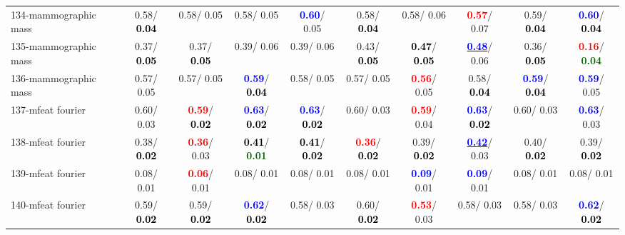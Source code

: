 \begin{table}[h]
\begin{center}
{\begin{tabular}{lc|c|c|c|c|c|c|c|c}
134-mammographic mass &   0.58/\textcolor{black}{\textbf{  0.04}} &   0.58/  0.05 &   0.58/  0.05 & \textcolor{blue}{\textbf{  0.60}}/  0.05 &   0.58/\textcolor{black}{\textbf{  0.04}} &   0.58/  0.06 & \textcolor{red}{\textbf{  0.57}}/  0.07 &   0.59/\textcolor{black}{\textbf{  0.04}} & \textcolor{blue}{\textbf{  0.60}}/\textcolor{black}{\textbf{  0.04}} \\
135-mammographic mass &   0.37/\textcolor{black}{\textbf{  0.05}} &   0.37/\textcolor{black}{\textbf{  0.05}} &   0.39/  0.06 &   0.39/  0.06 &   0.43/\textcolor{black}{\textbf{  0.05}} & \textcolor{black}{\textbf{  0.47}}/\textcolor{black}{\textbf{  0.05}} & \underline{\textcolor{blue}{\textbf{  0.48}}}/  0.06 &   0.36/\textcolor{black}{\textbf{  0.05}} & \textcolor{red}{\textbf{  0.16}}/\textcolor{darkgreen}{\textbf{  0.04}} \\ \hline
136-mammographic mass &   0.57/  0.05 &   0.57/  0.05 & \textcolor{blue}{\textbf{  0.59}}/\textcolor{black}{\textbf{  0.04}} &   0.58/  0.05 &   0.57/  0.05 & \textcolor{red}{\textbf{  0.56}}/  0.05 &   0.58/\textcolor{black}{\textbf{  0.04}} & \textcolor{blue}{\textbf{  0.59}}/\textcolor{black}{\textbf{  0.04}} & \textcolor{blue}{\textbf{  0.59}}/  0.05 \\
137-mfeat fourier &   0.60/  0.03 & \textcolor{red}{\textbf{  0.59}}/\textcolor{black}{\textbf{  0.02}} & \textcolor{blue}{\textbf{  0.63}}/\textcolor{black}{\textbf{  0.02}} & \textcolor{blue}{\textbf{  0.63}}/\textcolor{black}{\textbf{  0.02}} &   0.60/  0.03 & \textcolor{red}{\textbf{  0.59}}/  0.04 & \textcolor{blue}{\textbf{  0.63}}/\textcolor{black}{\textbf{  0.02}} &   0.60/  0.03 & \textcolor{blue}{\textbf{  0.63}}/  0.03 \\
138-mfeat fourier &   0.38/\textcolor{black}{\textbf{  0.02}} & \textcolor{red}{\textbf{  0.36}}/  0.03 & \textcolor{black}{\textbf{  0.41}}/\textcolor{darkgreen}{\textbf{  0.01}} & \textcolor{black}{\textbf{  0.41}}/\textcolor{black}{\textbf{  0.02}} & \textcolor{red}{\textbf{  0.36}}/\textcolor{black}{\textbf{  0.02}} &   0.39/\textcolor{black}{\textbf{  0.02}} & \underline{\textcolor{blue}{\textbf{  0.42}}}/  0.03 &   0.40/\textcolor{black}{\textbf{  0.02}} &   0.39/\textcolor{black}{\textbf{  0.02}} \\
139-mfeat fourier &   0.08/  0.01 & \textcolor{red}{\textbf{  0.06}}/  0.01 &   0.08/  0.01 &   0.08/  0.01 &   0.08/  0.01 & \textcolor{blue}{\textbf{  0.09}}/  0.01 & \textcolor{blue}{\textbf{  0.09}}/  0.01 &   0.08/  0.01 &   0.08/  0.01 \\
140-mfeat fourier &   0.59/\textcolor{black}{\textbf{  0.02}} &   0.59/\textcolor{black}{\textbf{  0.02}} & \textcolor{blue}{\textbf{  0.62}}/\textcolor{black}{\textbf{  0.02}} &   0.58/  0.03 &   0.60/\textcolor{black}{\textbf{  0.02}} & \textcolor{red}{\textbf{  0.53}}/  0.03 &   0.58/  0.03 &   0.58/  0.03 & \textcolor{blue}{\textbf{  0.62}}/\textcolor{black}{\textbf{  0.02}} \\

\end{tabular}}
\end{center}
\end{table}

